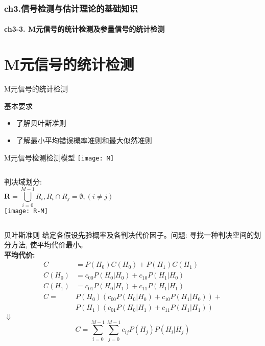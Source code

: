 \begin{frame}[shrink]
  \frametitle{ch3.信号检测与估计理论的基础知识}
  \framesubtitle{ch3-3. M元信号的统计检测及参量信号的统计检测}
  \tableofcontents[hideallsubsections]
\end{frame}

\section{M元信号的统计检测}

\begin{frame}{M元信号的统计检测}
\begin{block}{基本要求}
	\begin{itemize} 
		\item 了解贝叶斯准则
		\item 了解最小平均错误概率准则和最大似然准则
	\end{itemize}
\end{block}
\end{frame}

\begin{frame}{M元信号检测检测模型}
\texttt{[image: M]}
\newline
\begin{columns}
判决域划分:
\[\bm{R}=\bigcup_{i=0}^{M-1}R_i, R_i\cap R_j=\emptyset, (i\ne j) \]
\texttt{[image: R-M]}
\end{columns}
\end{frame}

\begin{frame}[shrink]{贝叶斯准则}
给定各假设先验概率及各判决代价因子。问题: 寻找一种判决空间的划分方法, 使平均代价最小。\\
\textbf{平均代价: }
\begin{align*}
C&=P(H_0)C(H_0)+P(H_1)C(H_1)\\
C(H_0)&=c_{00}P(H_0|H_0)+c_{10}P(H_1|H_0)\\
C(H_1)&=c_{01}P(H_0|H_1)+c_{11}P(H_1|H_1)\\
C=&P(H_0)(c_{00}P(H_0|H_0)+c_{10}P(H_1|H_0))+\\
&P(H_1)(c_{01}P(H_0|H_1)+c_{11}P(H_1|H_1))
\end{align*}
\centering$\Downarrow$
\[
C=\sum_{i=0}^{M-1}\sum_{j=0}^{M-1}c_{ij}P(H_j)P(H_i|H_j)
\]
\end{frame}

